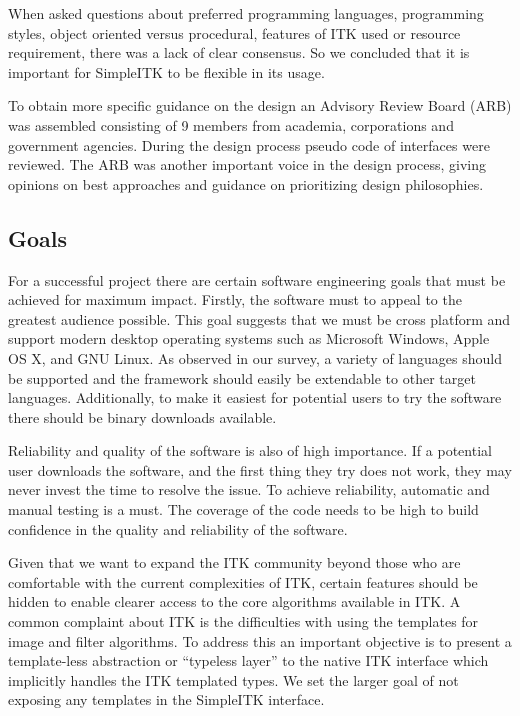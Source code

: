 \documentclass{frontiersMED} %
\begin{document}
When asked questions about preferred programming languages,
programming styles, object oriented versus procedural, features of ITK
used or resource requirement, there was a lack of clear consensus. So
we concluded that it is important for SimpleITK to be flexible in its
usage.

To obtain more specific guidance on the design an Advisory Review
Board (ARB) was assembled consisting of 9 members from academia,
corporations and government agencies. During the design process pseudo
code of interfaces were reviewed. The ARB was another important voice
in the design process, giving opinions on best approaches and guidance
on prioritizing design philosophies.

\subsection{Goals}
For a successful project there are certain software engineering goals
that must be achieved for maximum impact. Firstly, the software must to appeal
to the greatest audience possible. This goal suggests that we must be
cross platform and support modern desktop operating systems such as
Microsoft Windows, Apple OS X, and GNU Linux. As observed in our
survey, a variety of languages should be supported and the framework
should easily be extendable to other target languages. Additionally,
to make it easiest for potential users to try the software there should
be binary downloads available.

Reliability and quality of the software is also of high importance. If
a potential user downloads the software, and the first thing they try
does not work, they may never invest the time to resolve the issue. To
achieve reliability, automatic and manual testing is a must. The
coverage of the code needs to be high to build confidence in the
quality and reliability of the software.

Given that we want to expand the ITK community beyond those who are
comfortable with the current complexities of ITK, certain features
should be hidden to enable clearer access to the core algorithms
available in ITK. A common complaint about ITK is the
difficulties with using the templates for image and filter algorithms. To address this an
important objective is to present a template-less abstraction  or
“typeless layer” to the native ITK interface which implicitly handles
the ITK templated types. We set the larger goal of not exposing any
templates in the SimpleITK interface.
\end{document}
